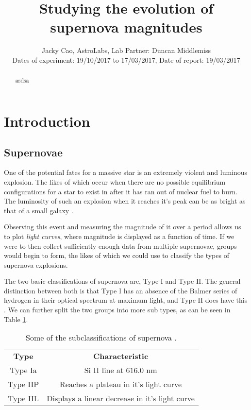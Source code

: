 \documentclass[twocolumn]{revtex4}
\begin{document}
\textheight=26.385cm

\title{Studying the evolution of supernova magnitudes}
 
\author{Jacky Cao, AstroLabs, Lab Partner: Duncan Middlemiss \\ Dates of experiment: 19/10/2017 to 17/03/2017, Date of report: 19/03/2017}

\begin{abstract}              
asdsa
\end{abstract}

\maketitle

\vspace{-3ex}
\section{Introduction} 
\vspace{-2ex}
\subsection{Supernovae}
\vspace{-2ex}

One of the potential fates for a massive star is an extremely violent and luminous explosion. The likes of which occur when there are no possible equilibrium configurations for a star to exist in after it has ran out of nuclear fuel to burn. The luminosity of such an explosion when it reaches it's peak can be as bright as that of a small galaxy \cite{longair}.

Observing this event and measuring the magnitude of it over a period allows us to plot {\em light curves\em}, where magnitude is displayed as a function of time. If we were to then collect sufficiently enough data from multiple supernovae, groups would begin to form, the likes of which we could use to classify the types of supernova explosions. 

The two basic classifications of supernova are, Type I and Type II. The general distinction between both is that Type I has an absence of the Balmer series of hydrogen in their optical spectrum at maximum light, and Type II does have this \cite{mod_ast, longair}. We can further split the two groups into more sub types, as can be seen in Table \ref{sn_classes}.

\begin{table}[h!]
\centering
\begin{tabular}{c@{\hskip 20pt}c} 
 \hline
 \textbf{Type} & \textbf{Characteristic} \\ 
 Type Ia		& Si II line at $616.0$ nm \\
 Type IIP 		& Reaches a plateau in it's light curve \\
 Type IIL		& Displays a linear decrease in it's light curve \\
 \hline
\end{tabular}
\caption{Some of the subclassifications of supernova \cite{longair}.}
\label{sn_classes}
\end{table}
\end{document}

